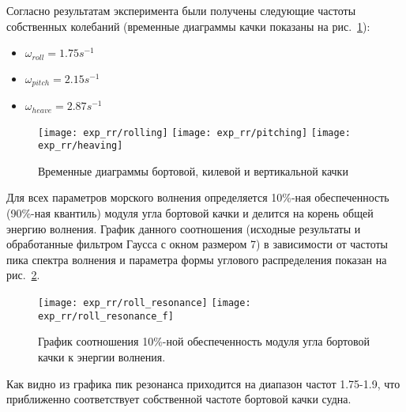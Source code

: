 Согласно результатам эксперимента были получены следующие частоты собственных колебаний (временные диаграммы качки показаны на рис.~\ref{exp_rr_rolling}):
\begin{itemize}
	\item	$ \omega_{roll} = 1.75 s^{-1}$
	\item	$ \omega_{pitch} = 2.15 s^{-1}$
	\item	$ \omega_{heave} = 2.87 s^{-1}$
\end{itemize}

\begin{figure}[ht]
	\begin{center}
	\texttt{[image: exp\_rr/rolling]}
	\texttt{[image: exp\_rr/pitching]}
	\texttt{[image: exp\_rr/heaving]}
	\end{center}
	\caption{Временные диаграммы бортовой, килевой и вертикальной качки}
	\label{exp_rr_rolling}
\end{figure}

Для всех параметров морского волнения определяется 10\%-ная обеспеченность (90\%-ная квантиль) модуля угла бортовой качки и делится на корень общей энергию волнения. График данного соотношения (исходные результаты и обработанные фильтром Гаусса с окном размером 7) в зависимости от частоты пика спектра волнения и параметра формы углового распределения показан на рис.~\ref{rr_res}.

\begin{figure}[ht]
	\begin{center}
	\texttt{[image: exp\_rr/roll\_resonance]}
	\texttt{[image: exp\_rr/roll\_resonance\_f]}
	\end{center}
	\caption{График соотношения 10\%-ной обеспеченность модуля угла бортовой качки к энергии волнения.}
	\label{rr_res}
\end{figure}

Как видно из графика пик резонанса приходится на диапазон частот 1.75-1.9, что приближенно соответствует собственной частоте бортовой качки судна.